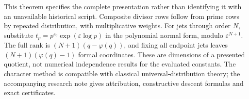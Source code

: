 \begin{remark}
This theorem specifies the complete presentation rather than identifying
it with an unavailable historical script. Composite divisor rows follow
from prime rows by repeated distribution, with multiplicative weights.
For jets through order $N$, substitute
$t_p=p^{s_0}\exp(\varepsilon\log p)$ in the polynomial normal form,
modulo $\varepsilon^{N+1}$. The full rank is
$(N+1)(q-\varphi(q))$, and fixing all endpoint jets leaves
$(N+1)(\varphi(q)-1)$ formal coordinates. These are dimensions of a
presented quotient, not numerical independence results for the evaluated
constants. The character method is compatible with classical
universal-distribution theory; the accompanying research note gives
attribution, constructive descent formulas and exact certificates.
\end{remark}

